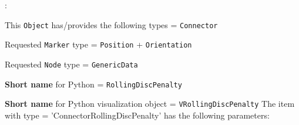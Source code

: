 \noindent {}:
\bi
  \item This \texttt{Object} has/provides the following types = \texttt{Connector}
  \item Requested \texttt{Marker} type = \texttt{Position} + \texttt{Orientation}
  \item Requested \texttt{Node} type = \texttt{GenericData}
  \item {\bf Short name} for Python = \texttt{RollingDiscPenalty}
  \item {\bf Short name} for Python visualization object = \texttt{VRollingDiscPenalty}
\ei\vspace{12pt} \noindent 
The item  with type = 'ConnectorRollingDiscPenalty' has the following parameters:
\vspace{-0.5cm}\\
\vspace{-0.5cm}\\
